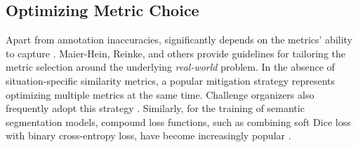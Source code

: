 \subsection{Optimizing Metric Choice}
\label{sec:metric_selection}
Apart from annotation inaccuracies,  significantly depends on the metrics' ability to capture .
Maier-Hein, Reinke, and others \citep{reinke2021common, maier2022metrics, reinke2022metrics, REINKE2021710} provide guidelines for tailoring the metric selection around the underlying \emph{real-world} problem.
In the absence of situation-specific similarity metrics, a popular mitigation strategy represents optimizing multiple metrics at the same time.
Challenge organizers also frequently adopt this strategy \citep{maier2018rankings}.
Similarly, for the training of semantic segmentation models, compound loss functions, such as combining soft Dice loss with binary cross-entropy loss,  have become increasingly popular \citep{isensee2021nnu,kofler2021we}.
